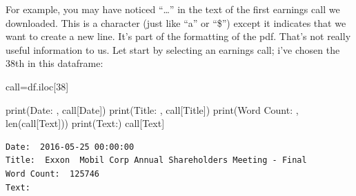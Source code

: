 \documentclass[
  letterpaper,
  DIV=11,
  numbers=noendperiod]{scrreprt}
\newenvironment{Shaded}{\begin{snugshade}}{\end{snugshade}}
\newcommand{\BuiltInTok}[1]{\textcolor[rgb]{0.00,0.23,0.31}{#1}}
\newcommand{\DecValTok}[1]{\textcolor[rgb]{0.68,0.00,0.00}{#1}}
\newcommand{\NormalTok}[1]{\textcolor[rgb]{0.00,0.23,0.31}{#1}}
\newcommand{\OperatorTok}[1]{\textcolor[rgb]{0.37,0.37,0.37}{#1}}
\newcommand{\StringTok}[1]{\textcolor[rgb]{0.13,0.47,0.30}{#1}}
\begin{document}
For example, you may have noticed ``\n\n\n\n\n\n\n\n\ldots{}'' in the
text of the first earnings call we downloaded. This is a character (just
like ``a'' or ``\$'') except it indicates that we want to create a new
line. It's part of the formatting of the pdf. That's not really useful
information to us. Let start by selecting an earnings call; i've chosen
the 38th in this dataframe:

\begin{Shaded}
\begin{Highlighting}[]
\NormalTok{call}\OperatorTok{=}\NormalTok{df.iloc[}\DecValTok{38}\NormalTok{]}

\BuiltInTok{print}\NormalTok{(}\StringTok{\textquotesingle{}Date: \textquotesingle{}}\NormalTok{, call[}\StringTok{\textquotesingle{}Date\textquotesingle{}}\NormalTok{])}
\BuiltInTok{print}\NormalTok{(}\StringTok{\textquotesingle{}Title: \textquotesingle{}}\NormalTok{, call[}\StringTok{\textquotesingle{}Title\textquotesingle{}}\NormalTok{])}
\BuiltInTok{print}\NormalTok{(}\StringTok{\textquotesingle{}Word Count: \textquotesingle{}}\NormalTok{, }\BuiltInTok{len}\NormalTok{(call[}\StringTok{\textquotesingle{}Text\textquotesingle{}}\NormalTok{]))}
\BuiltInTok{print}\NormalTok{(}\StringTok{\textquotesingle{}Text:\textquotesingle{}}\NormalTok{)}
\NormalTok{call[}\StringTok{\textquotesingle{}Text\textquotesingle{}}\NormalTok{]}
\end{Highlighting}
\end{Shaded}

\begin{verbatim}
Date:  2016-05-25 00:00:00
Title:  Exxon  Mobil Corp Annual Shareholders Meeting - Final
Word Count:  125746
Text:
\end{verbatim}
\end{document}
